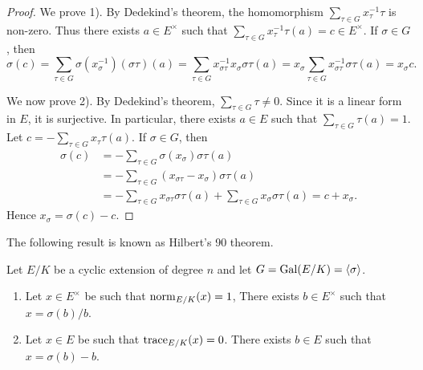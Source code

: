 \begin{proof}
    We prove 1). By Dedekind's theorem, the homomorphism 
    $\sum_{\tau\in G}x_{\tau}^{-1}\tau$ is non-zero. Thus there exists
    $a\in E^{\times}$ such that $\sum_{\tau\in G}x_{\tau}^{-1}\tau(a)=c\in E^{\times}$. 
    If $\sigma\in G$, 
    then 
    \[
    \sigma(c)=\sum_{\tau\in G}\sigma(x_{\sigma}^{-1})(\sigma\tau)(a)=
    \sum_{\tau\in G}x_{\sigma\tau}^{-1}x_{\sigma}\sigma\tau(a)
    =x_{\sigma}\sum_{\tau\in G}x_{\sigma\tau}^{-1}\sigma\tau(a)=x_{\sigma}c.
    \]
    
    We now prove 2). By Dedekind's theorem, $\sum_{\tau\in G}\tau\ne0$. Since
    it is a linear form in $E$, it is surjective. In particular, there exists 
    $a\in E$ such that $\sum_{\tau\in G}\tau(a)=1$. Let $c=-\sum_{\tau\in G}x_\tau\tau(a)$. 
    If $\sigma\in G$, then 
    \begin{align*}
    \sigma(c) &= -\sum_{\tau\in G}\sigma(x_{\sigma})\sigma\tau(a)\\
    &=-\sum_{\tau\in G}(x_{\sigma\tau}-x_{\sigma})\sigma\tau(a)\\
    &=-\sum_{\tau\in G}x_{\sigma\tau}\sigma\tau(a)+\sum_{\tau\in G}x_{\sigma}\sigma\tau(a)
    =c+x_{\sigma}.
    \end{align*}
    Hence $x_{\sigma}=\sigma(c)-c$. 
\end{proof}

The following result is known as Hilbert's 90 theorem. 

\begin{theorem}[Hilbert]
    Let $E/K$ be a cyclic extension of degree $n$ and let $G=\operatorname{Gal}(E/K)=\langle\sigma\rangle$. 
    \begin{enumerate}
        \item Let $x\in E^{\times}$ be such that $\operatorname{norm}_{E/K}(x)=1$, 
        There exists $b\in E^{\times}$ such that $x=\sigma(b)/b$. 
        \item Let  $x\in E$ be such that $\operatorname{trace}_{E/K}(x)=0$. 
        There exists $b\in E$ such that $x=\sigma(b)-b$. 
    \end{enumerate}
\end{theorem}

